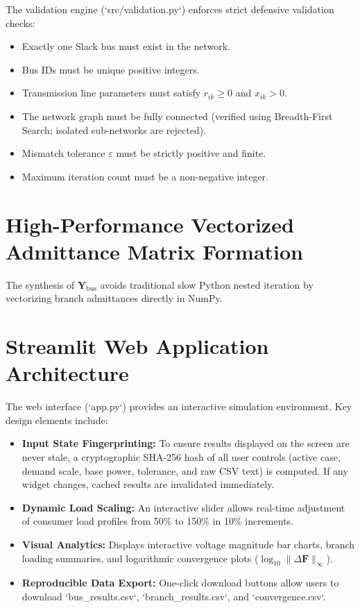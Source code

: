 \documentclass[12pt,a4paper,oneside]{report}
\begin{document}
The validation engine (`src/validation.py`) enforces strict defensive validation checks:
\begin{itemize}
    \item Exactly one Slack bus must exist in the network.
    \item Bus IDs must be unique positive integers.
    \item Transmission line parameters must satisfy $r_{ik} \ge 0$ and $x_{ik} > 0$.
    \item The network graph must be fully connected (verified using Breadth-First Search; isolated sub-networks are rejected).
    \item Mismatch tolerance $\varepsilon$ must be strictly positive and finite.
    \item Maximum iteration count must be a non-negative integer.
\end{itemize}

\section{High-Performance Vectorized Admittance Matrix Formation}
The synthesis of $\mathbf{Y}_{\text{bus}}$ avoids traditional slow Python nested iteration by vectorizing branch admittances directly in NumPy.

\section{Streamlit Web Application Architecture}
The web interface (`app.py`) provides an interactive simulation environment. Key design elements include:
\begin{itemize}
    \item \textbf{Input State Fingerprinting:} To ensure results displayed on the screen are never stale, a cryptographic SHA-256 hash of all user controls (active case, demand scale, base power, tolerance, and raw CSV text) is computed. If any widget changes, cached results are invalidated immediately.
    \item \textbf{Dynamic Load Scaling:} An interactive slider allows real-time adjustment of consumer load profiles from 50\% to 150\% in 10\% increments.
    \item \textbf{Visual Analytics:} Displays interactive voltage magnitude bar charts, branch loading summaries, and logarithmic convergence plots ($\log_{10} \|\Delta \mathbf{F}\|_\infty$).
    \item \textbf{Reproducible Data Export:} One-click download buttons allow users to download `bus_results.csv`, `branch_results.csv`, and `convergence.csv`.
\end{itemize}
\end{document}
